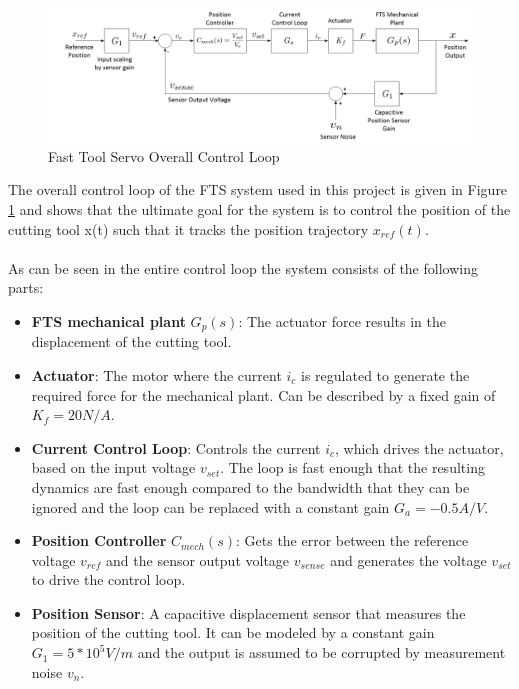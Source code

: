 \documentclass[a4paper, titlepage, 12pt]{article}
\begin{document}
		\begin{figure}
			\centering
			\includegraphics[width=\linewidth]{images/control_loop.PNG}
			\caption{Fast Tool Servo Overall Control Loop}
			\label{overall_control_loop}
		\end{figure}
		The overall control loop of the FTS system used in this project is given
		in Figure \ref{overall_control_loop} and shows that the ultimate goal for
		the system is to control the position of the cutting tool x(t) such that
		it tracks the position trajectory $x_{ref}(t)$. \\\\
		As can be seen in the entire control loop the system consists of the
		following parts: \\
		\begin{itemize}
		\item \textbf{FTS mechanical plant} $G_p(s)$: The actuator force results in
		the displacement of the cutting tool.
		\item \textbf{Actuator}: The motor where the current $i_c$ is regulated to
		generate the required force for the mechanical plant. Can be described
		by a fixed gain of $K_f = 20 N/A$.
		\item \textbf{Current Control Loop}: Controls the current $i_c$, which
		drives the actuator, based on the input voltage $v_{set}$. The loop is
		fast enough that the resulting dynamics are fast enough compared to the
		bandwidth that they can be ignored and the loop can be replaced with a
		constant gain $G_a=-0.5 A/V$.
		\item \textbf{Position Controller} $C_{mech}(s)$: Gets the error between
		the reference voltage $v_{ref}$ and the sensor output voltage $v_{sense}$
		and generates the voltage $v_{set}$ to drive the control loop.
		\item \textbf{Position Sensor}: A capacitive displacement sensor that
		measures the position of the cutting tool. It can be modeled by a constant
		gain $G_1 = 5*10^5V/m$ and the output is assumed to be corrupted by
		measurement noise $v_n$.
		\end{itemize}
\end{document}

